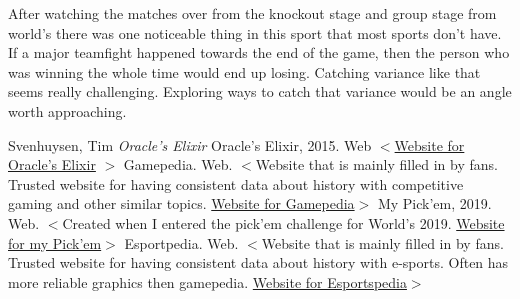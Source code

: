 \documentclass[11pt]{article}
\theoremstyle{plain}
\theoremstyle{definition}
\numberwithin{equation}{section}
\numberwithin{theorem}{section}
\numberwithin{lemma}{section}
\numberwithin{definition}{section}
\numberwithin{proposition}{section}
\numberwithin{corollary}{section}
\begin{document}
	
	After watching the matches over from the knockout stage and group stage from world's there was one noticeable thing in this sport that most sports don't have. If a major teamfight happened towards the end of the game, then the person who was winning the whole time would end up losing. Catching variance like that seems really challenging. Exploring ways to catch that variance would be an angle worth approaching.




\begin{thebibliography}{1}
			 Svenhuysen, Tim {\em Oracle's Elixir} Oracle's Elixir, 2015. Web
			$<$\href{http://oracleselixir.com/about/}{Website for Oracle's Elixir} $>$
			 Gamepedia. Web.
				$<$Website that is mainly filled in by fans. Trusted website for having consistent data about history with competitive gaming and other similar topics. \href{https://lol.gamepedia.com/League_of_Legends_Esports_Wiki}{Website for Gamepedia}$>$
			 My Pick'em, 2019. Web.
				$<$Created when I entered the pick'em challenge for World's 2019. \href{http://pickem.lolesports.com/share/series/6/user/2482088/my-picks}{Website for my Pick'em}$>$
			 Esportpedia. Web.
			$<$Website that is mainly filled in by fans. Trusted website for having consistent data about history with e-sports. Often has more reliable graphics then gamepedia. \href{https://www.esportspedia.com/lol/Worlds_Main_Event_2019}{Website for Esportspedia}$>$
\end{thebibliography}

	
	
	
	
	
 
\end{document}
